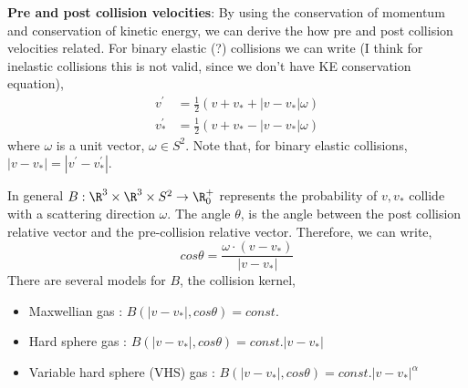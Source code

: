 \textbf{Pre and post collision velocities}: By using the conservation of momentum and conservation of kinetic energy, we can derive the how pre and post collision velocities related. For binary elastic (?) collisions we can write (I think for inelastic collisions this is not valid, since we don't have KE conservation equation), 
\begin{align}
    v^\prime  &= \frac{1}{2} (v + v_* + |v-v_*| \omega) \\
    v_*^\prime  &= \frac{1}{2} (v + v_* - |v-v_*| \omega)
\end{align} where $\omega$ is a unit vector, $\omega \in S^2$. Note that, for binary elastic collisions, $|v-v_*| = |v^\prime-v_*^\prime|$.

In general $B : \R^3 \times \R^3 \times S^2 \rightarrow \R_{0}^+$ represents the probability of $v,v_*$ collide with a scattering direction $\omega$. The angle $\theta$, is the angle between the post collision relative vector and the pre-collision relative vector. Therefore, we can write, 
\begin{equation}
    cos\theta = \frac{\omega \cdot (v-v_*)}{|v-v_*|}
\end{equation}
There are several models for $B$, the collision kernel,
\begin{itemize}
    \item Maxwellian gas : $B(|v-v_*|,cos\theta) = const.$
    \item Hard sphere gas : $B(|v-v_*|,cos\theta) = const.|v-v_*|$
    \item Variable hard sphere (VHS) gas : $B(|v-v_*|,cos\theta) = const. |v-v_*|^\alpha$
\end{itemize}